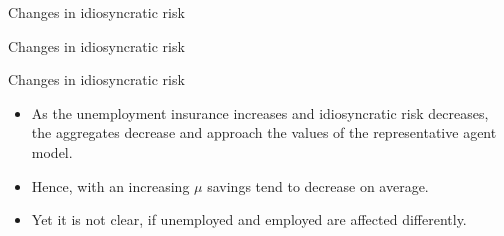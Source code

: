 \documentclass{beamer}
\begin{document}
\begin{frame}{Changes in idiosyncratic risk}

\end{frame}
	
\begin{frame}{Changes in idiosyncratic risk}

\end{frame}	
	
	
\begin{frame}{Changes in idiosyncratic risk}
	\begin{itemize}
	
	\item {
	As the unemployment insurance increases and idiosyncratic risk decreases, the aggregates decrease and approach the values of the representative agent model. 
	}

	\item {
Hence, with an increasing $\mu$ savings tend to decrease on average.
	}

	\item {
Yet it is not clear, if unemployed and employed are affected differently. 
	}	

	\end{itemize} 
\end{frame}
	
\end{document}
